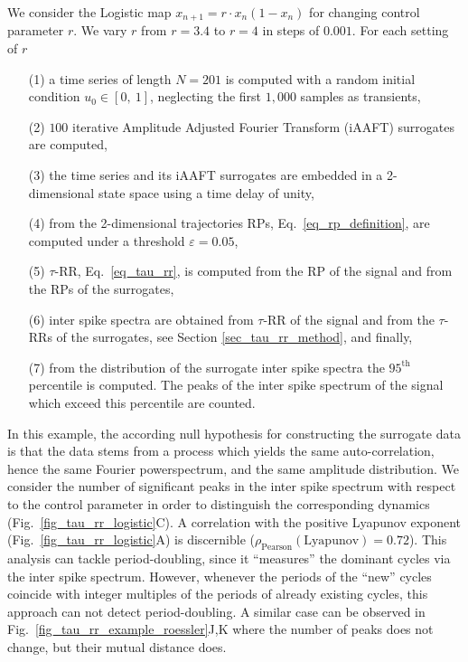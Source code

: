 \documentclass[entropy,article,submit,pdftex,moreauthors]{Definitions/mdpi}
\begin{document}
We consider the Logistic map $x_{n+1}=r\cdot x_n \left( 1-x_n \right)$ for changing control parameter $r$. We vary $r$ from $r=3.4$ to $r=4$ in steps of $0.001$. For 
each setting of $r$ 
\begin{itemize}[noitemsep]
\item[(1)] a time series of length $N=201$ is computed with a random initial condition $u_0 \in [0,\ 1]$, neglecting the first $1,000$ samples as transients,
\item[(2)] $100$ iterative Amplitude Adjusted Fourier Transform (iAAFT) surrogates \cite{Schreiber1996,Schreiber2000} are computed,
\item[(3)] the time series and its iAAFT surrogates are embedded in a 2-dimensional state space using a time delay of unity,
\item[(4)] from the 2-dimensional trajectories RPs, Eq.~\eqref{eq_rp_definition}, are computed under a threshold $\varepsilon=0.05$,
\item[(5)] $\tau$-RR, Eq.~\eqref{eq_tau_rr}, is computed from the RP of the signal and from the RPs of the surrogates,
\item[(6)] inter spike spectra are obtained from $\tau$-RR of the signal and from the $\tau$-RRs of the surrogates, see Section \ref{sec_tau_rr_method}, and finally,
\item[(7)] from the distribution of the surrogate inter spike spectra the $95^\text{th}$ percentile is computed. The peaks of the inter spike spectrum of the signal which exceed 
this percentile are counted. 
\end{itemize}
In this example, the according null hypothesis for constructing the surrogate data is that the data stems from a process which yields the same auto-correlation, 
hence the same Fourier powerspectrum, and the same 
amplitude distribution. We consider the number of significant peaks in the inter spike spectrum with
respect to the control parameter in order to distinguish the corresponding dynamics (Fig.~\ref{fig_tau_rr_logistic}C).
A correlation with the positive Lyapunov exponent (Fig.~\ref{fig_tau_rr_logistic}A) is discernible 
($\rho_{\text{Pearson}}(\text{Lyapunov})=0.72$). This analysis can tackle period-doubling, since it ``measures'' the dominant cycles via the inter spike spectrum. 
However, whenever the periods of the ``new'' cycles coincide with integer multiples of the periods of already existing cycles, this approach can not detect 
period-doubling. A similar case can be observed in Fig.~\ref{fig_tau_rr_example_roessler}J,K where the number of peaks does not change, but  their mutual distance does. 
\end{document}
